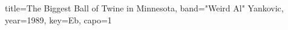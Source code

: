 \documentclass{skrul-leadsheet}
\begin{document}
\begin{song}[transpose-capo=true]{title={The Biggest Ball of Twine in Minnesota}, band={"Weird Al" Yankovic}, year={1989}, key={Eb}, capo={1}}



\end{song}
\end{document}
